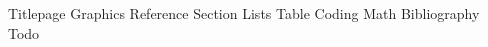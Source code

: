 \documentclass[12pt, letterpaper]{article}
\begin{document}
    {Titlepage}
    \pagebreak
    \tableofcontents
    \pagebreak
    {Graphics}
    \pagebreak
    {Reference}
    \pagebreak
    {Section}
    \pagebreak
    {Lists}
    \pagebreak
    {Table}
    \pagebreak
    {Coding}
    \pagebreak
    {Math}
    \pagebreak
    {Bibliography}
    \pagebreak
    {Todo}
\end{document}
